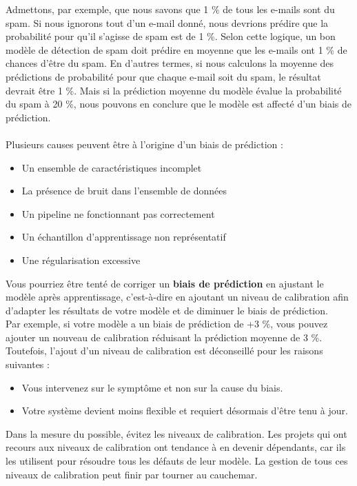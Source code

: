 \documentclass[french]{article}
\begin{document}
Admettons, par exemple, que nous savons que 1 \% de tous les e-mails sont du spam. Si nous ignorons tout d'un e-mail donné, nous devrions prédire que la probabilité pour qu'il s'agisse de spam est de 1 \%. Selon cette logique, un bon modèle de détection de spam doit prédire en moyenne que les e-mails ont 1 \% de chances d'être du spam. En d'autres termes, si nous calculons la moyenne des prédictions de probabilité pour que chaque e-mail soit du spam, le résultat devrait être 1 \%. Mais si la prédiction moyenne du modèle évalue la probabilité du spam à 20 \%, nous pouvons en conclure que le modèle est affecté d'un biais de prédiction.\\\\
Plusieurs causes peuvent être à l'origine d'un biais de prédiction :
\begin{itemize}[label=\textbullet]
	\item Un ensemble de caractéristiques incomplet
	\item La présence de bruit dans l'ensemble de données
	\item Un pipeline ne fonctionnant pas correctement
	\item Un échantillon d'apprentissage non représentatif
	\item Une régularisation excessive\\
\end{itemize}
Vous pourriez être tenté de corriger un \textbf{biais de prédiction} en ajustant le modèle après apprentissage, c'est-à-dire en ajoutant un niveau de calibration afin d'adapter les résultats de votre modèle et de diminuer le biais de prédiction.\\ 
Par exemple, si votre modèle a un biais de prédiction de +3 \%, vous pouvez ajouter un nouveau de calibration réduisant la prédiction moyenne de 3 \%.\\
Toutefois, l'ajout d'un niveau de calibration est déconseillé pour les raisons suivantes :
\begin{itemize}[label=\textbullet]
	\item Vous intervenez sur le symptôme et non sur la cause du biais.
	\item Votre système devient moins flexible et requiert désormais d'être tenu à jour.\\
\end{itemize}
Dans la mesure du possible, évitez les niveaux de calibration. Les projets qui ont recours aux niveaux de calibration ont tendance à en devenir dépendants, car ils les utilisent pour résoudre tous les défauts de leur modèle. La gestion de tous ces niveaux de calibration peut finir par tourner au cauchemar.
\end{document}
